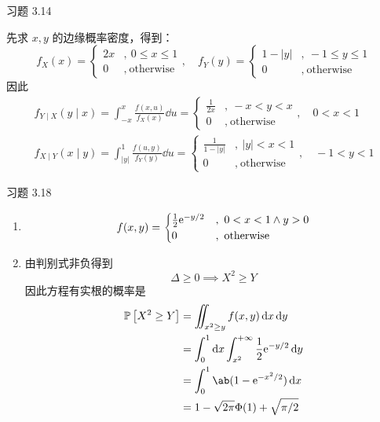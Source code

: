 \begin{problem}
    习题 3.14
    \begin{solution}
        先求 $x, y$ 的边缘概率密度，得到：
        $$
        f_X(x) = \begin{cases}
            2 x &,\ 0 \le x \le 1 \\
            0 &,\ \text{otherwise}
        \end{cases}, \quad f_Y(y) = \begin{cases}
            1 - |y| &,\ -1 \le y \le 1 \\
            0 &,\ \text{otherwise}
        \end{cases}
        $$
        因此
        $$
        \begin{gathered}
            f_{Y \mid X}(y \mid x) = \int_{-x}^{x} \frac{f(x, u)}{f_X(x)} \dd{u} = \begin{cases}
                \frac{1}{2x} &,\ -x < y < x \\
                0 &,\ \text{otherwise}
            \end{cases}, \quad 0 < x < 1 \\
            f_{X \mid Y}(x \mid y) = \int_{|y|}^{1} \frac{f(u, y)}{f_Y(y)} \dd{u} = \begin{cases}
                \frac{1}{1 - |y|} &,\ |y| < x < 1 \\
                0 &,\ \text{otherwise}
            \end{cases}, \quad -1 < y < 1
        \end{gathered}
        $$
    \end{solution}
\end{problem}

\begin{problem}
    习题 3.18
    \begin{solution}
        \begin{enumerate}
            \item[\textbf{1)}]
            $$
            f(x, y) = \begin{cases}
                \frac{1}{2} \mathrm{e}^{-y / 2} &,\ 0 < x < 1 \land y > 0 \\
                0 &,\ \text{otherwise}
            \end{cases}
            $$
            \item[\textbf{2)}] 由判别式非负得到
            $$
            \Delta \ge 0 \implies X^2 \ge Y
            $$
            因此方程有实根的概率是
            $$
            \begin{aligned}
                \prob{X^2 \ge Y} & = \iint_{x^2 \ge y} f(x, y) \dd{x} \dd{y} \\
                & = \int_{0}^{1} \dd{x} \int_{x^2}^{+\infty} \frac{1}{2} \E^{-y / 2} \dd{y} \\
                & = \int_{0}^{1} \ab(1 - \E^{-x^2 / 2}) \dd{x} \\
                & = 1 - \sqrt{2\pi} \Phi(1) + \sqrt{\pi / 2}
            \end{aligned}
            $$
        \end{enumerate}
    \end{solution}
\end{problem}

